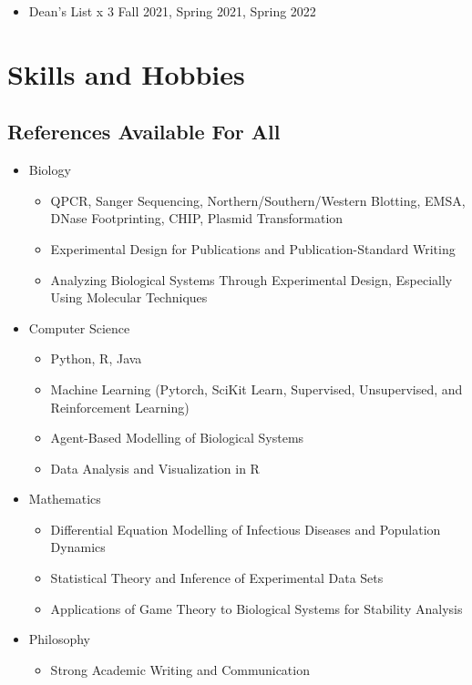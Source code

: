 \documentclass[letterpaper]{article}
\begin{document}
\begin{itemize}
  \item Dean's List x 3 \hfill Fall 2021, Spring 2021, Spring 2022 
\end{itemize}

\section*{Skills and Hobbies}
\subsection*{References Available For All}
\begin{itemize}
  \item Biology
  \begin{itemize}
    \item QPCR, Sanger Sequencing, Northern/Southern/Western Blotting, EMSA, DNase Footprinting, CHIP, Plasmid Transformation
    \item Experimental Design for Publications and Publication-Standard Writing
    \item Analyzing Biological Systems Through Experimental Design, Especially Using Molecular Techniques
  \end{itemize}
  \item Computer Science
  \begin{itemize}
    \item Python, R, Java
    \item Machine Learning (Pytorch, SciKit Learn, Supervised, Unsupervised, and Reinforcement Learning)
    \item Agent-Based Modelling of Biological Systems
    \item Data Analysis and Visualization in R
  \end{itemize}
  \item Mathematics
  \begin{itemize}
    \item Differential Equation Modelling of Infectious Diseases and Population Dynamics
    \item Statistical Theory and Inference of Experimental Data Sets 
    \item Applications of Game Theory to Biological Systems for Stability Analysis
  \end{itemize}
  \item Philosophy
  \begin{itemize}
    \item Strong Academic Writing and Communication

\end{itemize}
\end{itemize}
\end{document}
